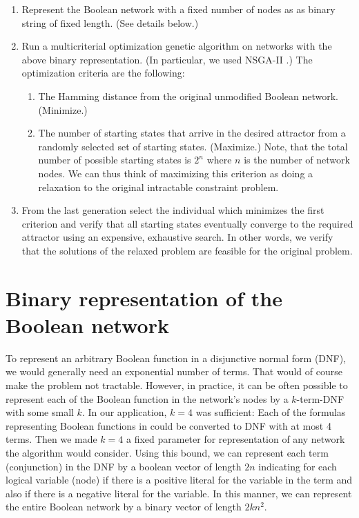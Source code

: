 \documentclass[a4paper,10pt]{article}
\begin{document}
\begin{enumerate}
 \item Represent the Boolean network with a fixed number of nodes
 as as binary string of fixed length. (See details below.)
 \item Run a multicriterial optimization genetic algorithm on networks with the above binary representation.
 (In particular, we used NSGA-II \cite{nsga2}.) The optimization criteria are the following:
 \begin{enumerate}
  \item The Hamming distance from the original unmodified Boolean network. (Minimize.)
  \item The number of starting states that arrive in the desired attractor from a randomly selected set of starting states. (Maximize.)
  Note, that the total number of possible starting states is $2^n$ where $n$ is the number of network nodes. 
  We can thus think of maximizing this criterion as doing a relaxation to the original intractable constraint problem.
 \end{enumerate}
 \item From the last generation select the individual which minimizes the first criterion and verify that 
 all starting states eventually converge to the required attractor using an expensive, exhaustive search.
 In other words, we verify that the solutions of the relaxed problem are feasible for the original problem.
\end{enumerate}

\section{Binary representation of the Boolean network}
To represent an arbitrary Boolean function in a disjunctive normal form (DNF),
we would generally need an exponential number of terms. That would of course make the problem not tractable.
However, in practice, it can be often possible to represent each of the Boolean function
in the network's nodes by a $k$-term-DNF with some small $k$. In our application, $k = 4$ was sufficient:
Each of the formulas representing Boolean functions in \cite{rodriguez1} could be converted to DNF 
with at most 4 terms. Then we made $k = 4$ a fixed parameter for representation of any network the algorithm
would consider. Using this bound, we can represent each term (conjunction) in the DNF
by a boolean vector of length $2n$ indicating for each logical variable (node) if there is a positive literal for 
the variable in the term and also if there is a negative literal for the variable.
In this manner, we can represent the entire Boolean network by a binary vector of length $2kn^2$.
\end{document}
